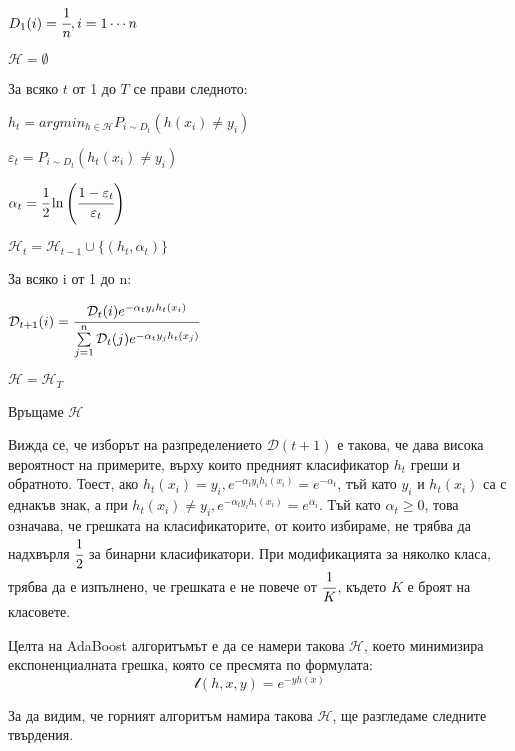 \documentclass[main.tex]{subfiles}
\begin{document}
\begin{exampleenv}
	\begin{alg}
		\item $D_1(i) = \cfrac{1}{n}, i = 1\cdots n$
		\item $\mathcal{H} = \emptyset$
		\item За всяко $t$ от 1 до $T$ се прави следното:
		\begin{alg}
			\item $h_t = argmin_{h\in \mathcal{H}} P_{i\sim D_t}(h(x_i) \neq y_i)$
			\item $\varepsilon_t = P_{i\sim D_t}(h_t(x_i) \neq y_i)$
			\item $\alpha_t = \cfrac{1}{2}\ln\left(\cfrac{1 - \varepsilon_t}{\varepsilon_t}\right)$
			\item $\mathcal{H}_t = \mathcal{H}_{t-1} \cup \{(h_t, \alpha_t)\}$
			\item За всяко i от 1 до n:
			\begin{alg}
				\item $\mathcal{D}_{t+1}(i) = \cfrac{\mathcal{D}_t(i) e^{-\alpha_t y_i h_t(x_i)}}{\sum\limits_{j=1}^n \mathcal{D}_t(j) e^{-\alpha_t y_j h_t(x_j)}}$
			\end{alg} 
		\end{alg}
		\item $\mathcal{H} = \mathcal{H}_T$
		\item Връщаме $\mathcal{H}$
	\end{alg}
\end{exampleenv}

Вижда се, че изборът на разпределението $\mathcal{D}(t+1)$ е такова, че дава висока вероятност на примерите, върху които предният класификатор $h_t$ греши и обратното. Тоест, ако $h_t(x_i) = y_i, e^{-\alpha_t y_i h_i(x_i)} = e^{-\alpha_t}$, тъй като $y_i$ и $h_t(x_i)$ са с еднакъв знак, а при $h_t(x_i) \neq y_i, e^{-\alpha_t y_i h_i(x_i)} = e^{\alpha_i}$. Тъй като $\alpha_t \geq 0$, това означава, че грешката на класификаторите, от които избираме, не трябва да надхвърля $\cfrac{1}{2}$ за бинарни класификатори. При модификацията за няколко класа, трябва да е изпълнено, че грешката е не повече от $\cfrac{1}{K}$, където $K$ е броят на класовете.

Целта на AdaBoost алгоритъмът е да се намери такова $\mathcal{H}$, което минимизира експоненциалната грешка, която се пресмята по формулата:
\[
	\mathcal{l}(h, x, y) = e^{-yh(x)}
\]

За да видим, че горният алгоритъм намира такова $\mathcal{H}$, ще разгледаме следните твърдения. 
\end{document}
